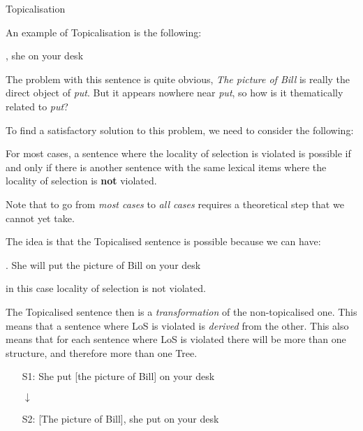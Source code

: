 \begin{frame}
{Topicalisation}

An example of Topicalisation is the following:

  , she  on your desk



The problem with this sentence is quite obvious, \textit{The picture of Bill} is really the direct object of \textit{put}. But it appears nowhere near \textit{put}, so how is it thematically related to \textit{put}?

\end{frame}


\begin{frame}
To find a satisfactory solution to this problem, we need to consider the following:

  \begin{block}

For most cases, a sentence where the locality of selection is violated is possible if and only if there is another sentence with the same lexical items where the locality of selection is \textbf{not} violated. 
    
  \end{block}
Note that to go from \textit{most cases} to \textit{all cases} requires a theoretical step that we cannot yet take.

\end{frame}


\begin{frame}
The idea is that the Topicalised sentence is possible because we can have:

\ex.
She will put the picture of Bill on your desk


in this case locality of selection is not violated.
  
\end{frame}

\begin{frame}
  The Topicalised sentence then is a \textit{transformation} of the non-topicalised one.  This means that a sentence where LoS is violated is \textit{derived} from the other.  This also means that for each sentence where LoS is violated there will be more than one structure, and therefore more than one Tree.
 
\end{frame}




\begin{frame}
  \begin{itemize}
  \item[S1:] She put [the picture of Bill] on your desk
  \item[] \hspace*{1in} $\downarrow$
  \item[S2:]  [The picture of Bill], she put  on your desk
  \end{itemize}
\end{frame}

